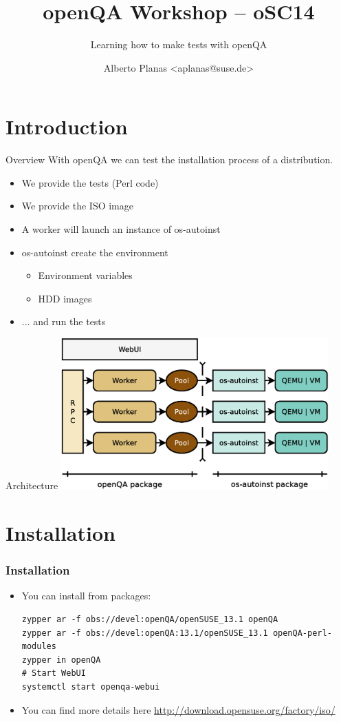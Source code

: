 \documentclass{beamer}
\author{Alberto Planas <aplanas@suse.de>\newline {\small openSUSE Team}}
\title{openQA Workshop -- oSC14}
\subtitle{Learning how to make tests with openQA}
\begin{document}
\begin{frame}[t,plain]
  \titlepage
\end{frame}


\section{Introduction}
%
%
\begin{frame}{Overview}
  With openQA we can test the installation process of a distribution.
  \begin{itemize}
  \item We provide the tests (Perl code)
  \item We provide the ISO image
  \item A worker will launch an instance of os-autoinst
  \item os-autoinst create the environment
    \begin{itemize}
    \item Environment variables
    \item HDD images
    \end{itemize}
  \item ... and run the tests
  \end{itemize}
\end{frame}

%
%
\begin{frame}{Architecture}
  \includegraphics[height=5.8cm,width=10.3cm]{arch}
\end{frame}


\section{Installation}
%
%
\begin{frame}[fragile]
  \frametitle{Installation}
  \begin{itemize}
  \item You can install from packages:
    \lstset{style=mybash}
    \begin{lstlisting}
zypper ar -f obs://devel:openQA/openSUSE_13.1 openQA
zypper ar -f obs://devel:openQA:13.1/openSUSE_13.1 openQA-perl-modules
zypper in openQA
# Start WebUI
systemctl start openqa-webui
    \end{lstlisting}
  \item You can find more details here\newline
    \url{http://download.opensuse.org/factory/iso/}
  \end{itemize}
\end{frame}
\end{document}
